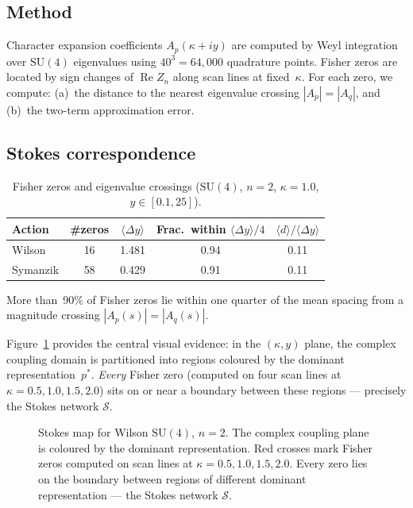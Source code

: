 \documentclass[12pt]{article}
\theoremstyle{definition}
\theoremstyle{remark}
\newcommand{\SU}{\mathrm{SU}}
\newcommand{\avg}[1]{\langle #1 \rangle}
\newcommand{\re}{\operatorname{Re}}
\begin{document}
\subsection{Method}

Character expansion coefficients $A_p(\kappa + iy)$ are computed by
Weyl integration over $\SU(4)$ eigenvalues using $40^3 = 64{,}000$
quadrature points.  Fisher zeros are located by sign changes of
$\re Z_n$ along scan lines at fixed~$\kappa$.  For each zero, we
compute: (a)~the distance to the nearest eigenvalue crossing
$|A_p| = |A_q|$, and (b)~the two-term approximation error.

\subsection{Stokes correspondence}

\begin{table}[h]
\centering
\caption{Fisher zeros and eigenvalue crossings ($\SU(4)$,
  $n = 2$, $\kappa = 1.0$, $y \in [0.1, 25]$).}
\label{tab:crossing}
\begin{tabular}{lcccc}
\toprule
Action & \#zeros & $\avg{\Delta y}$ &
  Frac.\ within $\avg{\Delta y}/4$ &
  $\avg{d}/\avg{\Delta y}$ \\
\midrule
Wilson   & 16  & 1.481 & 0.94 & 0.11 \\
Symanzik & 58  & 0.429 & 0.91 & 0.11 \\
\bottomrule
\end{tabular}
\end{table}

More than~90\% of Fisher zeros lie within one quarter of the mean
spacing from a magnitude crossing $|A_p(s)| = |A_q(s)|$.

Figure~\ref{fig:stokes_map} provides the central visual evidence:
in the $(\kappa, y)$ plane, the complex coupling domain is partitioned
into regions coloured by the dominant representation~$p^*$.
\emph{Every} Fisher zero (computed on four scan lines at
$\kappa = 0.5, 1.0, 1.5, 2.0$) sits on or near a boundary between
these regions --- precisely the Stokes network $\mathcal{S}$.

\begin{figure}[h]
\centering
\caption{Stokes map for Wilson $\SU(4)$, $n = 2$.  The complex
  coupling plane is coloured by the dominant representation.  Red
  crosses mark Fisher zeros computed on scan lines at
  $\kappa = 0.5, 1.0, 1.5, 2.0$.  Every zero lies on the boundary
  between regions of different dominant representation ---
  the Stokes network $\mathcal{S}$.}
\label{fig:stokes_map}
\end{figure}
\end{document}
